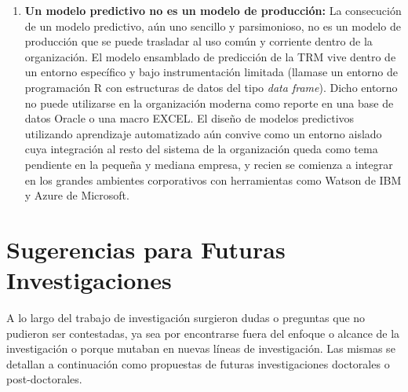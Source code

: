 \begin{enumerate}
    \item \textbf{Un modelo predictivo no es un modelo de producción:} La consecución de un modelo predictivo, aún uno sencillo y parsimonioso, no es un modelo de producción que se puede trasladar al uso común y corriente dentro de la organización. El modelo ensamblado de predicción de la TRM vive dentro de un entorno específico y bajo instrumentación limitada (llamase un entorno de programación R con estructuras de datos del tipo \emph{data frame}). Dicho entorno no puede utilizarse en la organización moderna como reporte en una base de datos Oracle o una macro EXCEL. El diseño de modelos predictivos utilizando aprendizaje automatizado aún convive como un entorno aislado cuya integración al resto del sistema de la organización queda como tema pendiente en la pequeña y mediana empresa, y recien se comienza a integrar en los grandes ambientes corporativos con herramientas como Watson de IBM y Azure de Microsoft.
\end{enumerate}

\section{Sugerencias para Futuras Investigaciones}
A lo largo del trabajo de investigación surgieron dudas o preguntas que no pudieron ser contestadas, ya sea por encontrarse fuera del enfoque o alcance de la investigación o porque mutaban en nuevas líneas de investigación. Las mismas se detallan a continuación como propuestas de futuras investigaciones doctorales o post-doctorales.


